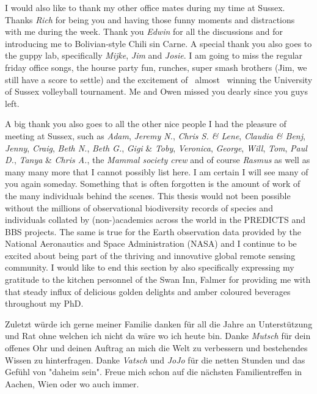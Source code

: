 I would also like to thank my other office mates during my time at Sussex. Thanks \textit{Rich} for being you and having those funny moments and distractions with me during the week. Thank you \textit{Edwin} for all the discussions and for introducing me to Bolivian-style Chili sin Carne. A special thank you also goes to the guppy lab, specifically \textit{Mijke}, \textit{Jim} and \textit{Josie}. I am going to miss the regular friday office songs, the hourse party fun, runches, super smash brothers (Jim, we still have a score to settle) and the excitement of \textendash\ almost \textendash\ winning the University of Sussex volleyball tournament. Me and Owen missed you dearly since you guys left.

A big thank you also goes to all the other nice people I had the pleasure of meeting at Sussex, such as \textit{Adam}, \textit{Jeremy N.}, \textit{Chris S. \& Lene}, \textit{Claudia \& Benj}, \textit{Jenny}, \textit{Craig}, \textit{Beth N.}, \textit{Beth G.}, \textit{Gigi} \& \textit{Toby}, \textit{Veronica}, \textit{George}, \textit{Will}, \textit{Tom}, \textit{Paul D.}, \textit{Tanya} \& \textit{Chris A.}, the \textit{Mammal society crew} and of course \textit{Rasmus} as well as many many more that I cannot possibly list here. I am certain I will see many of you again someday. Something that is often forgotten is the amount of work of the many individuals behind the scenes. This thesis would not been possible without the millions of observational biodiversity records of species and individuals collated by (non-)academics across the world in the PREDICTS and BBS projects. The same is true for the Earth observation data provided by the National Aeronautics and Space Administration (NASA) and I continue to be excited about being part of the thriving and innovative global remote sensing community. I would like to end this section by also specifically expressing my gratitude to the kitchen personnel of the Swan Inn, Falmer for providing me with that steady influx of delicious golden delights and amber coloured beverages throughout my PhD. 

Zuletzt w\"{u}rde ich gerne meiner Familie danken für all die Jahre an Unterstützung und Rat ohne welchen ich nicht da w\"{a}re wo ich heute bin. Danke \textit{Mutsch} f\"{u}r dein offenes Ohr und deinen Auftrag an mich die Welt zu verbessern und bestehendes Wissen zu hinterfragen. Danke \textit{Vatsch} und \textit{JoJo} f\"{u}r die netten Stunden und das Gef\"{u}hl von "daheim sein". Freue mich schon auf die n\"{a}chsten Familientreffen in Aachen, Wien oder wo auch immer. 
